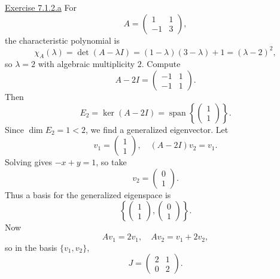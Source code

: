 \documentclass{exam}
\begin{document}
\underline{Exercise 7.1.2.a}
\newline
\newline
For
\[
A=\begin{pmatrix}1 & 1\\-1 & 3\end{pmatrix},
\]
the characteristic polynomial is
\[
\chi_A(\lambda)=\det(A-\lambda I)
=(1-\lambda)(3-\lambda)+1
=(\lambda-2)^2,
\]
so $\lambda=2$ with algebraic multiplicity $2$. Compute
\[
A-2I=\begin{pmatrix}-1 & 1\\-1 & 1\end{pmatrix}.
\]
Then
\[
E_2=\ker(A-2I)=\operatorname{span}\left\{\begin{pmatrix}1\\1\end{pmatrix}\right\}.
\]
Since $\dim E_2=1<2$, we find a generalized eigenvector. Let
\[
v_1=\begin{pmatrix}1\\1\end{pmatrix}, \quad (A-2I)v_2=v_1.
\]
Solving gives $-x+y=1$, so take
\[
v_2=\begin{pmatrix}0\\1\end{pmatrix}.
\]
Thus a basis for the generalized eigenspace is
\[
\left\{
\begin{pmatrix}1\\1\end{pmatrix},
\begin{pmatrix}0\\1\end{pmatrix}
\right\}.
\]
Now
\[
Av_1=2v_1, \quad Av_2=v_1+2v_2,
\]
so in the basis $\{v_1,v_2\}$,
\[
J=
\begin{pmatrix}
2 & 1\\
0 & 2
\end{pmatrix}.
\]
\end{document}
